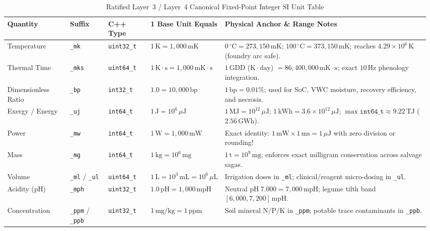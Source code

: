 \begin{table}[htbp]
\centering
\caption{Ratified Layer~3 / Layer~4 Canonical Fixed-Point Integer SI Unit Table}
\label{tab:ch2-si-units}
\footnotesize
\begin{tabular}{@{}llllp{5.5cm}@{}}
\toprule
\textbf{Quantity} & \textbf{Suffix} & \textbf{C++ Type} & \textbf{1 Base Unit Equals} & \textbf{Physical Anchor \& Range Notes} \\
\midrule
Temperature & \texttt{\_mk} & \texttt{uint32\_t} & $1\,\mathrm{K} = 1{,}000\,\mathrm{mK}$ & $0\,^\circ\mathrm{C} = 273{,}150\,\mathrm{mK}$; $100\,^\circ\mathrm{C} = 373{,}150\,\mathrm{mK}$; reaches $4.29 \times 10^6\,\mathrm{K}$ (foundry arc safe). \\
Thermal Time & \texttt{\_mks} & \texttt{uint64\_t} & $1\,\mathrm{K\cdot s} = 1{,}000\,\mathrm{mK\cdot s}$ & $1\,\mathrm{GDD}$ ($\mathrm{K\cdot day}$) $= 86{,}400{,}000\,\mathrm{mK\cdot s}$; exact $10\,\mathrm{Hz}$ phenology integration. \\
Dimensionless Ratio & \texttt{\_bp} & \texttt{int32\_t} & $1.0 = 10{,}000\,\mathrm{bp}$ & $1\,\mathrm{bp} = 0.01\%$; used for SoC, VWC moisture, recovery efficiency, and necrosis. \\
Exergy / Energy & \texttt{\_uj} & \texttt{int64\_t} & $1\,\mathrm{J} = 10^6\,\mu\mathrm{J}$ & $1\,\mathrm{MJ} = 10^{12}\,\mu\mathrm{J}$; $1\,\mathrm{kWh} = 3.6 \times 10^{12}\,\mu\mathrm{J}$; $\max \texttt{int64\_t} \approx 9.22\,\mathrm{TJ}$ ($2.56\,\mathrm{GWh}$). \\
Power & \texttt{\_mw} & \texttt{int64\_t} & $1\,\mathrm{W} = 1{,}000\,\mathrm{mW}$ & Exact identity: $1\,\mathrm{mW} \times 1\,\mathrm{ms} = 1\,\mu\mathrm{J}$ with zero division or rounding! \\
Mass & \texttt{\_mg} & \texttt{int64\_t} & $1\,\mathrm{kg} = 10^6\,\mathrm{mg}$ & $1\,\mathrm{t} = 10^9\,\mathrm{mg}$; enforces exact milligram conservation across salvage sagas. \\
Volume & \texttt{\_ml} / \texttt{\_ul} & \texttt{uint64\_t} & $1\,\mathrm{L} = 10^3\,\mathrm{mL} = 10^6\,\mu\mathrm{L}$ & Irrigation doses in \texttt{\_ml}; clinical/reagent micro-dosing in \texttt{\_ul}. \\
Acidity (pH) & \texttt{\_mph} & \texttt{uint32\_t} & $1.0\,\mathrm{pH} = 1{,}000\,\mathrm{mpH}$ & Neutral $\mathrm{pH}\;7.000 = 7{,}000\,\mathrm{mpH}$; legume tilth band $[6{,}000, 7{,}200]\,\mathrm{mpH}$. \\
Concentration & \texttt{\_ppm} / \texttt{\_ppb} & \texttt{uint32\_t} & $1\,\mathrm{mg/kg} = 1\,\mathrm{ppm}$ & Soil mineral $\mathrm{N/P/K}$ in \texttt{\_ppm}; potable trace contaminants in \texttt{\_ppb}. \\

\end{tabular}
\end{table}
